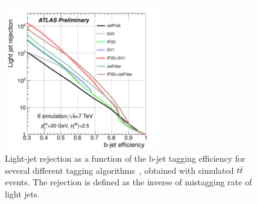 \begin{figure}[!t]
     \begin{center}

            \includegraphics[width=0.6\textwidth]{figure/obj/btag_perf.pdf}

    \end{center}
    \caption{Light-jet rejection as a function of the b-jet tagging efficiency for several different tagging algorithms~\cite{btagPerf},
	obtained with simulated $t\bar{t}$ events. The rejection is defined as the inverse of mistagging rate of light jets.}
   \label{fig:beff}
\end{figure}

